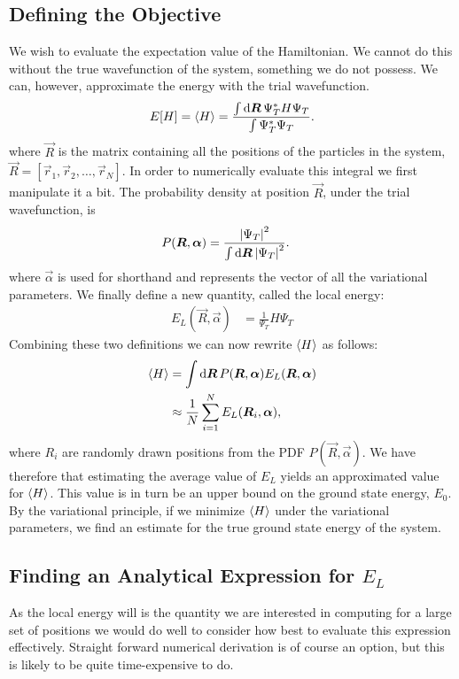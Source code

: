 \documentclass[twocolumn]{article}
\begin{document}
\subsection{Defining the Objective}
We wish to evaluate the expectation value of the Hamiltonian. We cannot do this
without the true wavefunction of the system, something we do not possess.
We can, however, approximate the energy with the trial wavefunction.
\begin{align}
    E[H] = \expval{H} = \frac{\int \dd{\bm R} \Psi^*_T H \Psi_T}{\int
    \Psi_T^*\Psi_T}.
\end{align}
where $\vec R$ is the matrix containing all the positions of the particles in
the system, $\vec R = [\vec r_1, \vec r_2, \dots, \vec r_N]$.
In order to numerically evaluate this integral we first manipulate it a bit.
The probability density at position $\vec R$, under the trial wavefunction, is
\begin{align}
    P(\bm R, \bm \alpha) &= \frac{\abs{\Psi_T}^2}{\int \dd{\bm R}\abs{\Psi_T}^2}.
\end{align}
where $\vec \alpha$ is used for shorthand and represents the vector of all the variational parameters.
We finally define a new quantity, called the local energy:
\begin{align}
    E_L(\vec R, \vec \alpha) &= \frac{1}{\Psi_T}H\Psi_T\label{eq:E_L}
\end{align}
Combining these two definitions we can now rewrite $\expval{H}$ as follows:
\begin{align}
    \begin{split}
        \expval{H} &= \int \dd{\bm R} P(\bm R,\bm\alpha) E_L(\bm R,\bm\alpha)\\
        &\approx
        \frac{1}{N}\sum_{i=1}^N E_L(\bm R_i,\bm\alpha),
    \end{split}
\end{align}
where $R_i$ are randomly drawn positions from the PDF $P(\vec R, \vec\alpha)$.
We have therefore that estimating the average value of $E_L$ yields an
approximated value for $\expval{H}$. This value is in turn be an upper bound on the
ground state energy, $E_0$. By the variational principle, if we minimize
$\expval{H}$ under the variational parameters, we find an estimate for the true
ground state energy of the system.


\subsection{Finding an Analytical Expression for $E_L$}
As the local energy will is the quantity we are interested in computing for a
large set of positions we would do well to consider how best to evaluate this
expression effectively. Straight forward numerical derivation is of course an
option, but this is likely to be quite time-expensive to do.
\end{document}
